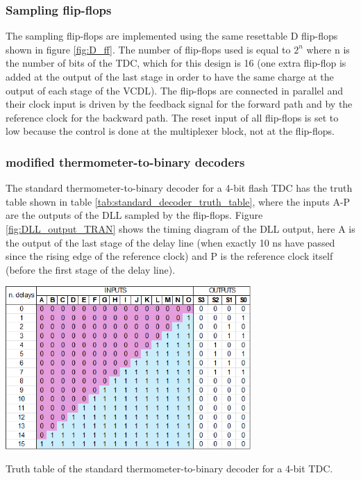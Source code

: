 \subsubsection{Sampling flip-flops}
The sampling flip-flops are implemented using the same resettable D flip-flops shown in figure \ref{fig:D_ff}. The number of flip-flops used is equal to $2^n$ where n is the number of bits of the TDC,
which for this design is 16 (one extra flip-flop is added at the output of the last stage in order to have the same charge at the output of each stage of the VCDL). The flip-flops are connected 
in parallel and their clock input is driven by the feedback signal for the forward path and by the reference clock for the backward path. The reset input of all flip-flops is set to low because the control
is done at the multiplexer block, not at the flip-flops.

\subsubsection{modified thermometer-to-binary decoders}
The standard thermometer-to-binary decoder for a 4-bit flash TDC has the truth table shown in table \ref{tab:standard_decoder_truth_table}, where the inputs A-P are the outputs of the DLL sampled by the flip-flops.
Figure \ref{fig:DLL_output_TRAN} shows the timing diagram of the DLL output, here A is the output of the last stage of the delay line (when exactly 10 ns have passed since the rising edge of the reference clock)
and P is the reference clock itself (before the first stage of the delay line).

\begin{table}
    \centering
    \includegraphics[width=0.7\textwidth]{figures/standard_decoder_truth_table.png}
    \caption{Truth table of the standard thermometer-to-binary decoder for a 4-bit TDC.}
    \label{tab:standard_decoder_truth_table}
\end{table}

